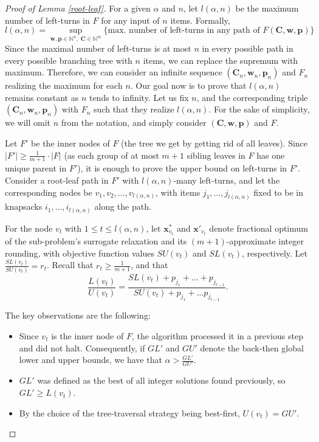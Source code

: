 \documentclass[a4paper,UKenglish,cleveref, autoref, thm-restate, pdfa]{lipics-v2021}
\theoremstyle{plain}
\begin{document}
\begin{proof}[Proof of Lemma \ref{root-leaf}]
    For a given $\alpha$ and $n$, let $l(\alpha, n)$ be the maximum number of left-turns in $F$ for any input of $n$ items. Formally,
    \[
l(\alpha, n) = \sup_{\bm{w}, \bm{p} \in \mathbb{N}^n, \; \bm{C} \in \mathbb{N}^m} \{\text{max. number of left-turns in any path of } F(\bm{C}, \bm{w}, \bm{p})\}
    \]
    Since the maximal number of left-turns is at most $n$ in every possible path in every possible branching tree with $n$ items, we can replace the supremum with maximum. Therefore, we can consider an infinite sequence $(\bm{C}_n, \bm{w}_n, \bm{p}_n)$ and $F_n$ realizing the maximum for each $n$. Our goal now is to prove that $l(\alpha, n)$ remains constant as $n$ tends to infinity. Let us fix $n$, and the corresponding triple $(\bm{C}_n, \bm{w}_n, \bm{p}_n)$ with $F_n$ such that they realize $l(\alpha, n)$. For the sake of simplicity, we will omit $n$ from the notation, and simply consider $(\bm{C}, \bm{w}, \bm{p})$ and $F$.

    Let $F'$ be the inner nodes of $F$ (the tree we get by getting rid of all leaves). Since $|F'| \ge \frac{1}{m+1} \cdot |F|$ (as each group of at most $m+1$ sibling leaves in $F$ has one unique parent in $F'$), it is enough to prove the upper bound on left-turns in $F'$. Consider a root-leaf path in $F'$ with $l(\alpha, n)$-many left-turns, and let the corresponding nodes be $v_1, v_2, \ldots, v_{l(\alpha, n)}$, with items $j_1, \ldots, j_{l(\alpha,n)}$ fixed to be in knapsacks $i_1, \ldots, i_{l(\alpha, n)}$ along the path.

    For the node $v_t$ with $1\le t\le l(\alpha, n)$, let $\bm{x}^* _{v_t}$ and $\bm{x}'_{v_t}$ denote fractional optimum of the sub-problem's surrogate relaxation and its $(m+1)$-approximate integer rounding, with objective function values $SU(v_t)$ and $SL(v_t)$, respectively. Let $\frac{SL(v_t)}{SU(v_t)} = r_t$. Recall that $r_t \ge \frac{1}{m+1}$, and that 
    \[
    \frac{L(v_t)}{U(v_t)} = \frac{SL(v_t) + p_{j_1} + \ldots + p_{j_{t-1}}}{SU(v_t) + p_{j_1} + \ldots p_{j_{t-1}}}.
    \]
    
    The key observations are the following:
    \begin{itemize}
        \item Since $v_t$ is the inner node of $F$, the algorithm processed it in a previous step and did not halt. Consequently, if $GL'$ and $GU'$ denote the back-then global lower and upper bounds, we have that $\alpha > \frac{GL'}{GU'}$.
        \item $GL'$ was defined as the best of all integer solutions found previously, so $GL' \ge L(v_t)$.
        \item By the choice of the tree-traversal strategy being best-first, $U(v_t) = GU'$.
    \end{itemize}
    

\end{proof}
\end{document}
